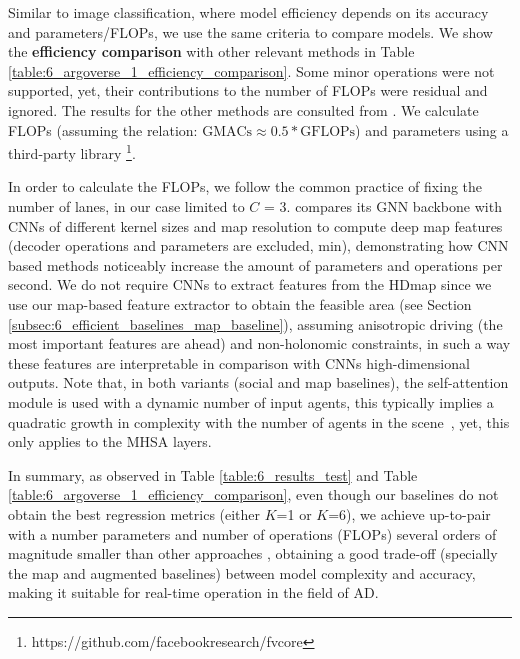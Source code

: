 Similar to image classification, where model efficiency depends on its accuracy and parameters/\acp{FLOP}, we use the same criteria to compare models. We show the \textbf{efficiency comparison} with other relevant methods in Table \ref{table:6_argoverse_1_efficiency_comparison}. Some minor operations were not supported, yet, their contributions to the number of \acp{FLOP} were residual and ignored. The results for the other methods are consulted from \cite{gilles2021home} \cite{gilles2022gohome} \cite{gao2020vectornet} \cite{he2022multi}. We calculate \acp{FLOP} (assuming the relation: $\text{GMACs} \approx 0.5 * \text{GFLOPs}$) and parameters using a third-party library \footnote{https://github.com/facebookresearch/fvcore}.

In order to calculate the FLOPs, we follow the common practice \cite{gao2020vectornet} \cite{gu2021densetnt} \cite{gilles2022gohome} of fixing the number of lanes, in our case limited to $C$ = 3. %
%
\cite{gao2020vectornet} compares its \ac{GNN} backbone with \acp{CNN} of different kernel sizes and map resolution to compute deep map features (decoder operations and parameters are excluded, min), demonstrating how \ac{CNN} based methods noticeably increase the amount of parameters and operations per second. We do not require \acp{CNN} to extract features from the \ac{HDmap} since we use our map-based feature extractor to obtain the feasible area (see Section \ref{subsec:6_efficient_baselines_map_baseline}), assuming anisotropic driving (the most important features are ahead) and non-holonomic constraints, in such a way these features are interpretable in comparison with \acp{CNN} high-dimensional outputs. Note that, in both variants (social and map baselines), the self-attention module is used with a dynamic number of input agents, this typically implies a quadratic growth in complexity with the number of agents in the scene~\cite{vaswani2017attention}, yet, this only applies to the \ac{MHSA} layers.

In summary, as observed in Table \ref{table:6_results_test} and Table \ref{table:6_argoverse_1_efficiency_comparison}, even though our baselines do not obtain the best regression metrics (either $K$=1 or $K$=6), we achieve up-to-pair with a number parameters and number of operations (\acp{FLOP}) several orders of magnitude smaller than other approaches \cite{gu2021densetnt} \cite{liang2020learning}, obtaining a good trade-off (specially the map and augmented baselines) between model complexity and accuracy, making it suitable for real-time operation in the field of \ac{AD}. 

